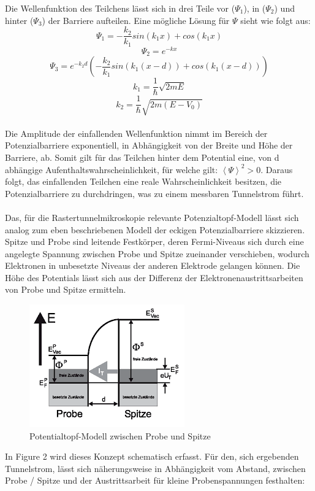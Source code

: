 \documentclass[10pt,a4paper]{article}
\begin{document}
Die Wellenfunktion des Teilchens lässt sich in drei Teile vor ($\Psi_{1}$), in ($\Psi_{2}$) und hinter ($\Psi_{3}$) der Barriere aufteilen. Eine mögliche Lösung für $\Psi$ sieht wie folgt aus:\\
$$\Psi_{1}= -\frac{k_{2}}{k_{1}}sin(k_{1}x) + cos(k_{1}x)$$ 
$$\Psi_{2}= e^{-kx}$$
$$\Psi_{3}= e^{-k_{2}d}(-\frac{k_{2}}{k_{1}}sin(k_{1}(x-d)) + cos(k_{1}(x-d)))$$
$$ k_{1} = \frac{1}{\hbar}\sqrt{2mE} $$
$$k_{2} = \frac{1}{\hbar}\sqrt{2m(E-V_{0})}$$
\\Die Amplitude der einfallenden Wellenfunktion nimmt im Bereich der Potenzialbarriere exponentiell, in Abhängigkeit von der Breite und Höhe der Barriere, ab. Somit gilt für das Teilchen hinter dem Potential eine, von d abhängige Aufenthaltswahrscheinlichkeit, für welche gilt: $\left \langle \Psi  \right \rangle^{2} > 0$. Daraus folgt, das einfallenden Teilchen eine reale Wahrscheinlichkeit besitzen, die Potenzialbarriere zu durchdringen, was zu einem messbaren Tunnelstrom führt. \\ \\Das, für die Rastertunnelmikroskopie relevante Potenzialtopf-Modell lässt sich analog zum eben beschriebenen Modell der eckigen Potenzialbarriere skizzieren. Spitze und Probe sind leitende Festkörper, deren Fermi-Niveaus sich durch eine angelegte Spannung zwischen Probe und Spitze zueinander verschieben, wodurch Elektronen in unbesetzte Niveaus der anderen Elektrode gelangen können. Die Höhe des Potentials lässt sich aus der Differenz der Elektronenaustrittsarbeiten von Probe und Spitze ermitteln.
\begin{figure}[h]
	\includegraphics[scale = 1.2]{potentialtopf.png}
	\centering
	\caption{Potentialtopf-Modell zwischen Probe und Spitze}
	\label{diagramm_aufspaltung}
\end{figure} 
In Figure 2 wird dieses Konzept schematisch erfasst. Für den, sich ergebenden Tunnelstrom, lässt sich näherungsweise in Abhängigkeit vom Abstand, zwischen Probe / Spitze und der Austrittsarbeit für kleine Probenspannungen festhalten: 
\end{document}
